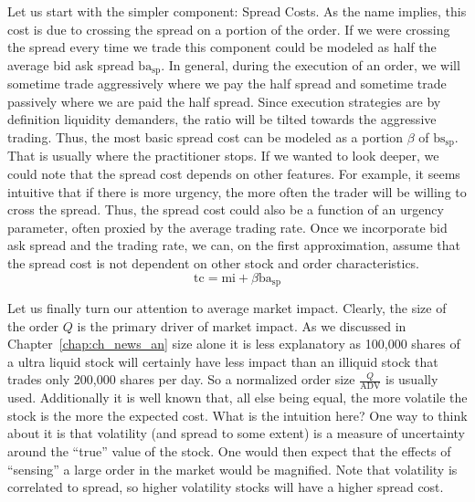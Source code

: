 Let us start with the simpler component: Spread Costs. As the name implies, this cost is due to crossing the spread on a portion of the order. If we were crossing the spread every time we trade this component could be modeled as half the average bid ask spread $\text{ba}_\text{sp}$. In general, during the execution of an order, we will sometime trade aggressively where we pay the half spread and sometime trade passively where we are paid the half spread. Since execution strategies are by definition liquidity demanders, the ratio will be tilted towards the aggressive trading. Thus, the most basic spread cost can be modeled as a portion $\beta$ of $\text{bs}_\text{sp}$. That is usually where the practitioner stops. If we wanted to look deeper, we could note that the spread cost depends on other features. For example, it seems intuitive that if there is more urgency, the more often the trader will be willing to cross the spread. Thus, the spread cost could also be a function of an urgency parameter, often proxied by the average trading rate. Once we incorporate bid ask spread and the trading rate, we can, on the first approximation, assume that the spread cost is not dependent on other stock and order characteristics.
        \begin{equation}\label{eq:tc_3}
        \text{tc}= \text{mi} + \beta \text{ba}_{\text{sp}}
        \end{equation}


Let us finally turn our attention to average market impact. Clearly, the size of the order $Q$ is the primary driver of market impact. As we discussed in Chapter~\ref{chap:ch_news_an} size alone it is less explanatory as 100,000 shares of a ultra liquid stock will certainly have less impact than an illiquid stock that trades only 200,000 shares per day. So a normalized order size $\frac{Q}{\text{ADV}}$ is usually used. Additionally it is well known that, all else being equal, the more volatile the stock is the more the expected cost. What is the intuition here? One way to think about it is that volatility (and spread to some extent) is a measure of  uncertainty around the ``true'' value of the stock. One would then expect that the effects of ``sensing'' a large order in the market would be magnified. Note that volatility is correlated to spread, so higher volatility stocks will have a higher spread cost.


